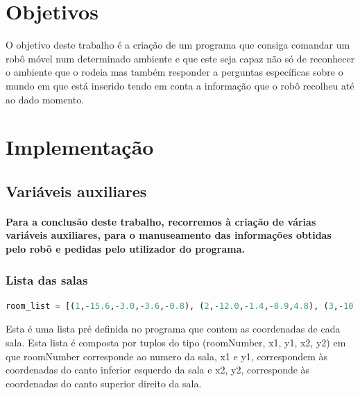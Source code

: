 \documentclass{article}
\begin{document}
\section{Objetivos}

O objetivo deste trabalho é a criação de um programa que consiga comandar um robô móvel num determinado ambiente e que este seja capaz não só de reconhecer o ambiente que o rodeia mas também responder a perguntas específicas sobre o mundo em que está inserido tendo em conta a informação que o robô recolheu até ao dado momento.

\newpage

\section{Implementação}

\subsection{Variáveis auxiliares}

\paragraph{Para a conclusão deste trabalho, recorremos à criação de várias variáveis auxiliares, para o manuseamento das informações obtidas pelo robô e pedidas pelo utilizador do programa.}

\subsubsection{Lista das salas}
\begin{lstlisting}[language=Python]
room_list = [(1,-15.6,-3.0,-3.6,-0.8), (2,-12.0,-1.4,-8.9,4.8), (3,-10.6,4.8,3.6,7.9), (4,-4.6,-0.8,-0.8,4.8), (5,-15.6,-1.4,-12.5,3.0), (6,-15.6,3.0,-12.5,7.9), (7,-15.6,7.9,-10.6,11.1), (8,-10.6,7.9,-5.6,11.1), (9,-5.6,7.9,-0.5,11.1), (10,-0.5,7.9,3.6,11.1), (11,-0.8,1.4,3.6,4.8), (12,-0.8,-0.8,3.6,1.4), (13,-8.9,-0.8,-6.5,4.8),(14,-6.5,-0.8,-4.6,4.8)]
\end{lstlisting}

Esta é uma lista pré definida no programa que contem as coordenadas de cada sala. Esta lista é composta por tuplos do tipo (roomNumber, x1, y1, x2, y2) em que roomNumber corresponde ao numero da sala, x1 e y1, correspondem às coordenadas do canto inferior esquerdo da sala e x2, y2, corresponde às coordenadas do canto superior direito da sala.
\end{document}
